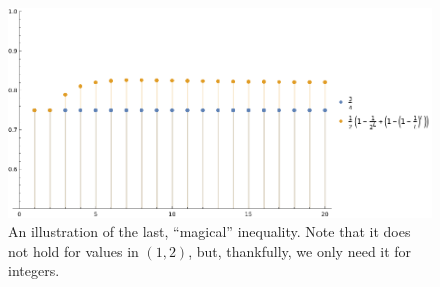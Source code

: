     \begin{figure}[htbp]
        \centering
        \includegraphics[width=1.25\textwidth]{figures/fig-randomrounding-bestofboth.png}
        \caption{An illustration of the last, ``magical'' inequality. Note that it does not hold for values in $(1,2)$, but, thankfully, we only need it for integers.}
        \label{fig:randomrounding:bestofboth}
    \end{figure}